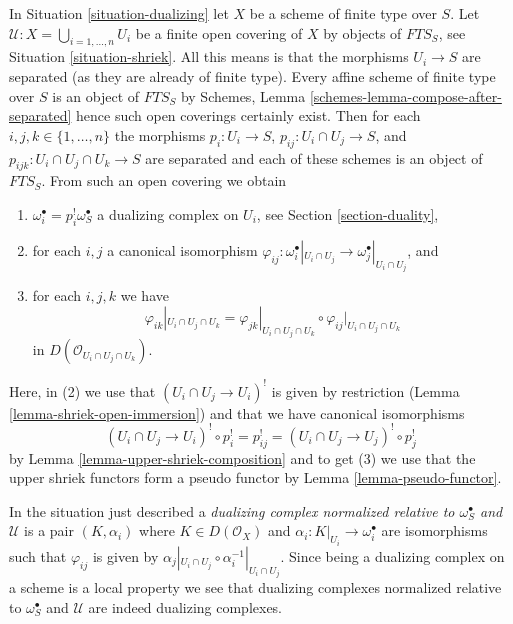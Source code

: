 \noindent
In Situation \ref{situation-dualizing} let $X$ be a scheme of finite type
over $S$. Let $\mathcal{U} : X = \bigcup_{i = 1, \ldots, n} U_i$
be a finite open covering of $X$ by objects of $\textit{FTS}_S$, see
Situation \ref{situation-shriek}. All this means is that the morphisms
$U_i \to S$ are separated (as they are already of finite type).
Every affine scheme of finite type over $S$ is an object of $\textit{FTS}_S$
by Schemes, Lemma \ref{schemes-lemma-compose-after-separated}
hence such open coverings certainly exist.
Then for each $i, j, k \in \{1, \ldots, n\}$
the morphisms $p_i : U_i \to S$, $p_{ij} : U_i \cap U_j \to S$,
and $p_{ijk} : U_i \cap U_j \cap U_k \to S$ are separated and
each of these schemes is an object of $\textit{FTS}_S$.
From such an open covering we obtain
\begin{enumerate}
\item $\omega_i^\bullet = p_i^!\omega_S^\bullet$
a dualizing complex on $U_i$, see Section \ref{section-duality},
\item for each $i, j$ a canonical isomorphism
$\varphi_{ij} :
\omega_i^\bullet|_{U_i \cap U_j} \to \omega_j^\bullet|_{U_i \cap U_j}$, and
\item
\label{item-cocycle-glueing}
for each $i, j, k$ we have
$$
\varphi_{ik}|_{U_i \cap U_j \cap U_k} =
\varphi_{jk}|_{U_i \cap U_j \cap U_k} \circ
\varphi_{ij}|_{U_i \cap U_j \cap U_k}
$$
in $D(\mathcal{O}_{U_i \cap U_j \cap U_k})$.
\end{enumerate}
Here, in (2) we use that $(U_i \cap U_j \to U_i)^!$
is given by restriction (Lemma \ref{lemma-shriek-open-immersion})
and that we have canonical isomorphisms
$$
(U_i \cap U_j \to U_i)^! \circ p_i^! = p_{ij}^! =
(U_i \cap U_j \to U_j)^! \circ p_j^!
$$
by Lemma \ref{lemma-upper-shriek-composition} and to get (3) we use
that the upper shriek functors form a pseudo functor by
Lemma \ref{lemma-pseudo-functor}.

\medskip\noindent
In the situation just described a
{\it dualizing complex normalized relative to $\omega_S^\bullet$
and $\mathcal{U}$} is a pair $(K, \alpha_i)$ where $K \in D(\mathcal{O}_X)$
and $\alpha_i : K|_{U_i} \to \omega_i^\bullet$ are isomorphisms
such that $\varphi_{ij}$ is given by
$\alpha_j|_{U_i \cap U_j} \circ \alpha_i^{-1}|_{U_i \cap U_j}$.
Since being a dualizing complex on a scheme is a local property
we see that dualizing complexes normalized relative to $\omega_S^\bullet$
and $\mathcal{U}$ are indeed dualizing complexes.

